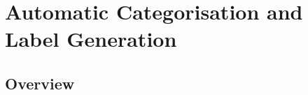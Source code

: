 \documentclass[10pt,oneside]{report}
\begin{document}

\chapter{Automatic Categorisation and Label Generation}\label{chap:Methodology}

\section{Overview}

\end{document}
